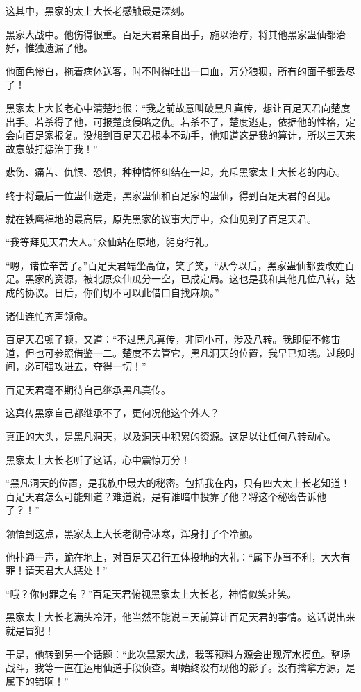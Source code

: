 \begin{this_body}
这其中，黑家的太上大长老感触最是深刻。

黑家大战中。他伤得很重。百足天君亲自出手，施以治疗，将其他黑家蛊仙都治好，惟独遗漏了他。

他面色惨白，拖着病体送客，时不时得吐出一口血，万分狼狈，所有的面子都丢尽了！

黑家太上大长老心中清楚地很：“我之前故意叫破黑凡真传，想让百足天君向楚度出手。若杀得了他，可报楚度侵略之仇。若杀不了，楚度逃走，依据他的性格，定会向百足家报复。没想到百足天君根本不动手，他知道这是我的算计，所以三天来故意敲打惩治于我！”

悲伤、痛苦、仇恨、恐惧，种种情怀纠结在一起，充斥黑家太上大长老的内心。

终于将最后一位蛊仙送走，黑家蛊仙和百足家的蛊仙，得到百足天君的召见。

就在铁鹰福地的最高层，原先黑家的议事大厅中，众仙见到了百足天君。

“我等拜见天君大人。”众仙站在原地，躬身行礼。

“嗯，诸位辛苦了。”百足天君端坐高位，笑了笑，“从今以后，黑家蛊仙都要改姓百足。黑家的资源，被北原众仙瓜分一空，已成定局。这也是我和其他几位八转，达成的协议。日后，你们切不可以此借口自找麻烦。”

诸仙连忙齐声领命。

百足天君顿了顿，又道：“不过黑凡真传，非同小可，涉及八转。我即便不修宙道，但也可参照借鉴一二。楚度不去管它，黑凡洞天的位置，我早已知晓。过段时间，必可强攻进去，夺得一切！”

百足天君毫不期待自己继承黑凡真传。

这真传黑家自己都继承不了，更何况他这个外人？

真正的大头，是黑凡洞天，以及洞天中积累的资源。这足以让任何八转动心。

黑家太上大长老听了这话，心中震惊万分！

“黑凡洞天的位置，是我族中最大的秘密。包括我在内，只有四大太上长老知道！百足天君怎么可能知道？难道说，是有谁暗中投靠了他？将这个秘密告诉他了？！”

领悟到这点，黑家太上大长老彻骨冰寒，浑身打了个冷颤。

他扑通一声，跪在地上，对百足天君行五体投地的大礼：“属下办事不利，大大有罪！请天君大人惩处！”

“哦？你何罪之有？”百足天君俯视黑家太上大长老，神情似笑非笑。

黑家太上大长老满头冷汗，他当然不能说三天前算计百足天君的事情。这话说出来就是冒犯！

于是，他转到另一个话题：“此次黑家大战，我等预料方源会出现浑水摸鱼。整场战斗，我等一直在运用仙道手段侦查。却始终没有现他的影子。没有擒拿方源，是属下的错啊！”


\end{this_body}
